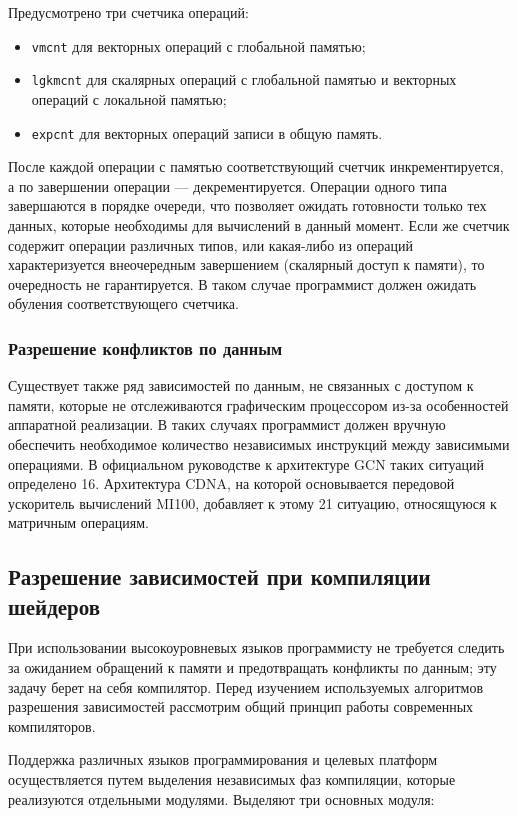 \documentclass[a4paper,14pt]{extarticle}
\newenvironment{ul}{\begin{itemize}[noitemsep,topsep=0em]}{\end{itemize}\vspace{4mm}}
\begin{document}
Предусмотрено три счетчика операций:
\begin{ul}
\item \texttt{vmcnt} для векторных операций с глобальной памятью;
\item \texttt{lgkmcnt} для скалярных операций с глобальной памятью и векторных операций с локальной памятью;
\item \texttt{expcnt} для векторных операций записи в общую память.
\end{ul}

После каждой операции с памятью соответствующий счетчик инкрементируется, а по завершении
операции — декрементируется. Операции одного типа завершаются в порядке очереди, что
позволяет ожидать готовности только тех данных, которые необходимы для вычислений в данный
момент. Если же счетчик содержит операции различных типов, или какая-либо из операций
характеризуется внеочередным завершением (скалярный доступ к памяти), то очередность не гарантируется.
В таком случае программист должен ожидать обуления соответствующего счетчика.

\subsubsection{Разрешение конфликтов по данным}

Существует также ряд зависимостей по данным, не связанных с доступом к памяти,
которые не отслеживаются графическим процессором из-за особенностей аппаратной реализации.
В таких случаях программист должен вручную обеспечить необходимое количество независимых
инструкций между зависимыми операциями. В официальном руководстве к архитектуре GCN
таких ситуаций определено 16\cite{vega-isa}. Архитектура CDNA, на которой основывается передовой ускоритель
вычислений MI100, добавляет к этому 21 ситуацию, относящуюся к матричным операциям\cite{cdna-isa}.

\subsection{Разрешение зависимостей при компиляции шейдеров}

При использовании высокоуровневых языков программисту не требуется следить
за ожиданием обращений к памяти и предотвращать конфликты по данным;
эту задачу берет на себя компилятор. Перед изучением используемых алгоритмов
разрешения зависимостей рассмотрим общий принцип работы современных компиляторов.

Поддержка различных языков программирования и целевых платформ осуществляется
путем выделения независимых фаз компиляции, которые реализуются отдельными модулями.
Выделяют три основных модуля\cite[Глава~1]{compilers}:
\end{document}
